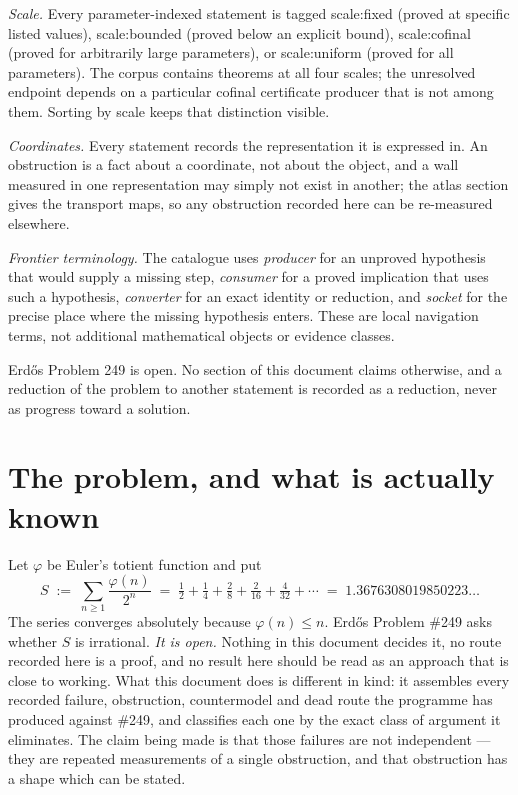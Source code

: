 \documentclass[11pt]{article}
\theoremstyle{plain}
\theoremstyle{definition}
\theoremstyle{remark}
\newcommand{\scale}[1]{{\small\textsf{scale:#1}}\xspace}
\begin{document}
\emph{Scale.}  Every parameter-indexed statement is tagged \scale{fixed} (proved
at specific listed values), \scale{bounded} (proved below an explicit bound),
\scale{cofinal} (proved for arbitrarily large parameters), or \scale{uniform}
(proved for all parameters).  The corpus contains theorems at all four scales;
the unresolved endpoint depends on a particular cofinal certificate producer
that is not among them.  Sorting by scale keeps that distinction visible.

\emph{Coordinates.}  Every statement records the representation it is expressed
in.  An obstruction is a fact about a coordinate, not about the object, and a
wall measured in one representation may simply not exist in another; the atlas
section gives the transport maps, so any obstruction recorded here can be
re-measured elsewhere.

\emph{Frontier terminology.}  The catalogue uses \emph{producer} for an
unproved hypothesis that would supply a missing step, \emph{consumer} for a
proved implication that uses such a hypothesis, \emph{converter} for an exact
identity or reduction, and \emph{socket} for the precise place where the
missing hypothesis enters.  These are local navigation terms, not additional
mathematical objects or evidence classes.

Erd\H{o}s Problem 249 is open.  No section of this document claims
otherwise, and a reduction of the problem to another statement is recorded as a
reduction, never as progress toward a solution.
\clearpage
\tableofcontents
\clearpage
\section{The problem, and what is actually known}

Let $\varphi$ be Euler's totient function and put
\[
  S \;:=\; \sum_{n \ge 1} \frac{\varphi(n)}{2^{n}}
  \;=\; \tfrac12 + \tfrac14 + \tfrac{2}{8} + \tfrac{2}{16} + \tfrac{4}{32} + \cdots
  \;=\; 1.3676308019850223\ldots
\]
The series converges absolutely because $\varphi(n) \le n$. Erd\H{o}s Problem
\#249 asks whether $S$ is irrational. \emph{It is open.} Nothing in this
document decides it, no route recorded here is a proof, and no result here
should be read as an approach that is close to working. What this document
does is different in kind: it assembles every recorded failure, obstruction,
countermodel and dead route the programme has produced against \#249, and
classifies each one by the exact class of argument it eliminates. The claim
being made is that those failures are not independent --- they are repeated
measurements of a single obstruction, and that obstruction has a shape which
can be stated.
\end{document}
